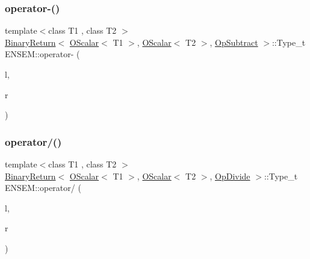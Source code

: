 \mbox{\label{group__obsscalar_gaf2bbff6744c4daa8183665c15f4052b4}} 
\subsubsection{\texorpdfstring{operator-\/()}{operator-()}\hspace{0.1cm}{\footnotesize\ttfamily [2/2]}}
{\footnotesize\ttfamily template$<$class T1 , class T2 $>$ \\
\mbox{\hyperlink{structENSEM_1_1BinaryReturn}{Binary\+Return}}$<$ \mbox{\hyperlink{classENSEM_1_1OScalar}{O\+Scalar}}$<$ T1 $>$, \mbox{\hyperlink{classENSEM_1_1OScalar}{O\+Scalar}}$<$ T2 $>$, \mbox{\hyperlink{structENSEM_1_1OpSubtract}{Op\+Subtract}} $>$\+::Type\+\_\+t E\+N\+S\+E\+M\+::operator-\/ (\begin{DoxyParamCaption}\item[{const \mbox{\hyperlink{classENSEM_1_1OScalar}{O\+Scalar}}$<$ T1 $>$ \&}]{l,  }\item[{const \mbox{\hyperlink{classENSEM_1_1OScalar}{O\+Scalar}}$<$ T2 $>$ \&}]{r }\end{DoxyParamCaption})\hspace{0.3cm}{\ttfamily [inline]}}

\mbox{\label{group__obsscalar_gadc02b34a3b7610b73a4ab6d413f19c17}} 
\subsubsection{\texorpdfstring{operator/()}{operator/()}}
{\footnotesize\ttfamily template$<$class T1 , class T2 $>$ \\
\mbox{\hyperlink{structENSEM_1_1BinaryReturn}{Binary\+Return}}$<$ \mbox{\hyperlink{classENSEM_1_1OScalar}{O\+Scalar}}$<$ T1 $>$, \mbox{\hyperlink{classENSEM_1_1OScalar}{O\+Scalar}}$<$ T2 $>$, \mbox{\hyperlink{structENSEM_1_1OpDivide}{Op\+Divide}} $>$\+::Type\+\_\+t E\+N\+S\+E\+M\+::operator/ (\begin{DoxyParamCaption}\item[{const \mbox{\hyperlink{classENSEM_1_1OScalar}{O\+Scalar}}$<$ T1 $>$ \&}]{l,  }\item[{const \mbox{\hyperlink{classENSEM_1_1OScalar}{O\+Scalar}}$<$ T2 $>$ \&}]{r }\end{DoxyParamCaption})\hspace{0.3cm}{\ttfamily [inline]}}

